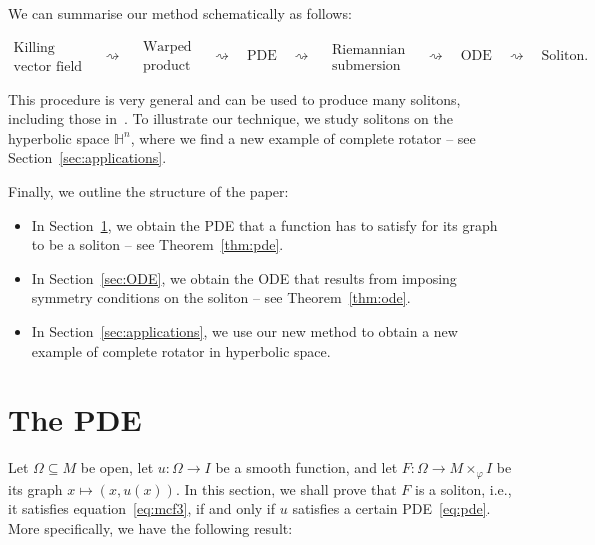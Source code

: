 \documentclass[oneside,12pt]{amsart}
\theoremstyle{definition}
\begin{document}
We can summarise our method schematically as follows:  

{\small \begin{equation} \label{eq:method}
\begin{aligned}
\text{Killing} \\
\text{vector field}
\end{aligned}
\quad \rightsquigarrow \quad
\begin{aligned}
\text{Warped} \\
\text{product}
\end{aligned}
\quad \rightsquigarrow \quad
\text{PDE}
\quad \rightsquigarrow \quad
\begin{aligned}
\text{Riemannian} \\
\text{submersion}
\end{aligned}
\quad \rightsquigarrow \quad
\text{ODE}
\quad \rightsquigarrow \quad
\text{Soliton. }
\end{equation} } 


This procedure is very general and can be used to produce many solitons, including those in~\cite{BL25}. To illustrate our technique, we study solitons on the hyperbolic space $\mathbb{H}^n$, where we find a new example of complete rotator -- see Section~\ref{sec:applications}.

Finally, we outline the structure of the paper:
\begin{itemize}
    \item In Section~\ref{sec:PDE}, we obtain the PDE that a function has to satisfy for its graph to be a soliton -- see Theorem~\ref{thm:pde}. 
    \item In Section~\ref{sec:ODE}, we obtain the ODE that results from imposing symmetry conditions on the soliton -- see Theorem~\ref{thm:ode}. 
    \item In Section~\ref{sec:applications}, we use our new method to obtain a new example of complete rotator in hyperbolic space. 
\end{itemize}


\section{The PDE}\label{sec:PDE}

Let $\Omega \subseteq M$ be open, let $u \colon \Omega \to I$ be a smooth function, and let $F \colon \Omega \to M \times_{\varphi} I$ be its graph $x \mapsto (x,u(x))$. In this section, we shall prove that $F$ is a soliton, i.e., it satisfies equation~\eqref{eq:mcf3},  if and only if $u$ satisfies a certain PDE~\eqref{eq:pde}. More specifically, we have the following result:
\end{document}
